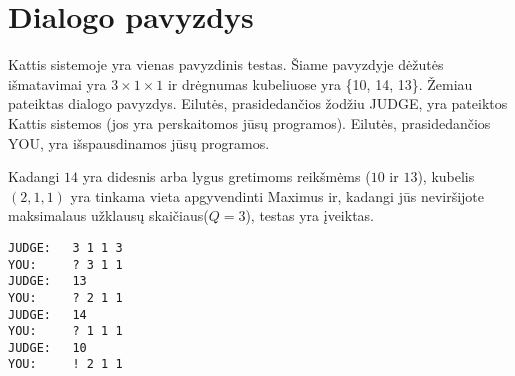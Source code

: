 \section*{Dialogo pavyzdys}
Kattis sistemoje yra vienas pavyzdinis testas.
Šiame pavyzdyje dėžutės išmatavimai yra $3\times 1\times 1$ ir drėgnumas kubeliuose yra \{10, 14, 13\}.
Žemiau pateiktas dialogo pavyzdys. Eilutės, prasidedančios žodžiu JUDGE, yra pateiktos Kattis sistemos (jos yra perskaitomos jūsų programos). Eilutės, prasidedančios YOU, yra išspausdinamos jūsų programos.

Kadangi $14$ yra didesnis arba lygus gretimoms reikšmėms ($10$ ir $13$), kubelis $(2,1,1)$ yra tinkama vieta apgyvendinti Maximus ir, kadangi jūs neviršijote maksimalaus užklausų skaičiaus($Q=3$), testas yra įveiktas.

\begin{verbatim}
JUDGE:   3 1 1 3
YOU:     ? 3 1 1
JUDGE:   13
YOU:     ? 2 1 1
JUDGE:   14
YOU:     ? 1 1 1
JUDGE:   10
YOU:     ! 2 1 1
\end{verbatim}
